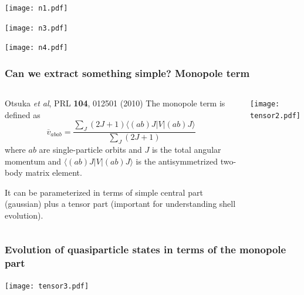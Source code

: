 \documentclass[compress]{beamer}
\begin{document}
 \frame
 {
 \begin{center}
 \texttt{[image: n1.pdf]}
 \end{center}
 }

 \frame
 {
 \begin{center}
 \texttt{[image: n3.pdf]}
\end{center}
 }

 \frame
 {
 \begin{center}
 \texttt{[image: n4.pdf]}
 \end{center}
 }


\frame
    {
      \frametitle{Can we extract something simple? Monopole term}
	
      \begin{footnotesize}
     \begin{columns}

      \begin{block}{Otsuka {\em et al}, PRL {\bf 104}, 012501 (2010)}
The monopole term is defined as
\[
\overline{v}_{abab} 
=\frac{\sum_{J} (2J+1)\langle (ab) J | V | (ab) J\rangle}
{\sum_J (2J+1)}
\]
where $ab$ are single-particle orbits and $J$ is the total angular momentum
and
$\langle (ab) J | V | (ab) J \rangle$ is the 
antisymmetrized  two-body matrix element.

It can be parameterized in terms of  simple central part (gaussian) plus a tensor
part (important for understanding shell evolution).
  
\end{block}
\column{4cm}
      \begin{center}
	\texttt{[image: tensor2.pdf]}
       \end{center}
\end{columns}
      \end{footnotesize}
    }


\frame
{
  \frametitle{Evolution of quasiparticle states in terms of the monopole part}
      \begin{center}
	\texttt{[image: tensor3.pdf]}
      \end{center}
    }
\end{document}
